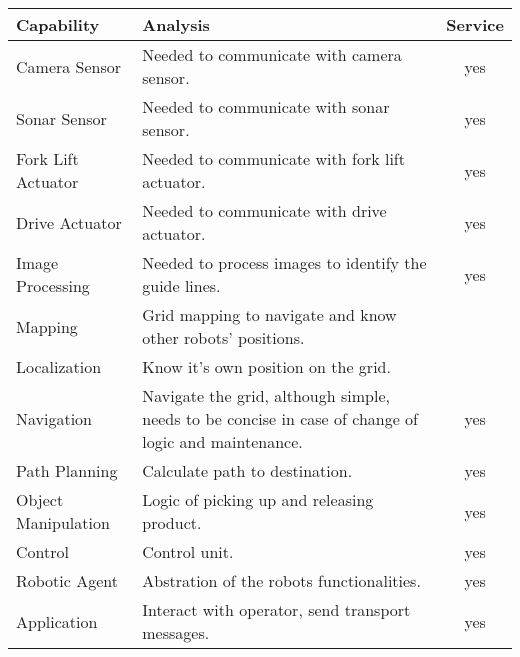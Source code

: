 {
\centering
\begin{tabular}{| l | p{6.6cm} | c |}
	\hline
	Capability & Analysis & Service\\
	\hline
	Camera Sensor & Needed to communicate with camera sensor. & yes\\
	Sonar Sensor & Needed to communicate with sonar sensor. & yes\\
	Fork Lift Actuator & Needed to communicate with fork lift actuator. & yes\\
	Drive Actuator & Needed to communicate with drive actuator. & yes\\
	\hline
	Image Processing & Needed to process images to identify the guide lines. & yes\\
	Mapping & Grid mapping to navigate and know other robots' positions. &\\
	Localization & Know it's own position on the grid. &\\ %
	Navigation & Navigate the grid, although simple, needs to be concise in case of change of logic and maintenance. & yes\\
	Path Planning & Calculate path to destination. & yes\\
	Object Manipulation & Logic of picking up and releasing product. & yes\\
	Control & Control unit. & yes\\
	Robotic Agent & Abstration of the robots functionalities. & yes\\
	Application & Interact with operator, send transport messages. & yes\\
	\hline
\end{tabular}
}

